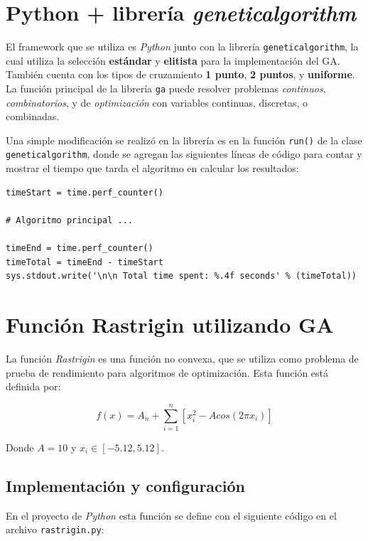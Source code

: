 \documentclass[a4paper, 12pt]{article}
\begin{document}
\section{Python + librería \emph{geneticalgorithm}}
El framework que se utiliza es \emph{Python} junto con la librería \lstinline{geneticalgorithm}, la cual utiliza la selección \textbf{estándar} y \textbf{elitista} para la implementación del GA. También cuenta con los tipos de cruzamiento \textbf{1 punto}, \textbf{2 puntos}, y \textbf{uniforme}. La función principal de la librería \lstinline{ga} puede resolver problemas \emph{continuos}, \emph{combinatorios}, y de \emph{optimización} con variables continuas, discretas, o combinadas.

Una simple modificación se realizó en la librería es en la función \lstinline{run()} de la clase \lstinline{geneticalgorithm}, donde se agregan las siguientes líneas de código para contar y mostrar el tiempo que tarda el algoritmo en calcular los resultados:

\begin{lstlisting}
timeStart = time.perf_counter()

# Algoritmo principal ...

timeEnd = time.perf_counter()
timeTotal = timeEnd - timeStart
sys.stdout.write('\n\n Total time spent: %.4f seconds' % (timeTotal))
\end{lstlisting}

\section{Función Rastrigin utilizando GA}
La función \emph{Rastrigin} es una función no convexa, que se utiliza como problema de prueba de rendimiento para algoritmos de optimización. Esta función está definida por:

\begin{equation}
    f(x)=A_n+\sum_{i=1}^n[x_i^2-Acos(2\pi x_i)]
\end{equation}

Donde $A=10$ y $x_i\in [-5.12,5.12]$.

\subsection{Implementación y configuración}
En el proyecto de \emph{Python} esta función se define con el siguiente código en el archivo \lstinline{rastrigin.py}:


\end{document}
